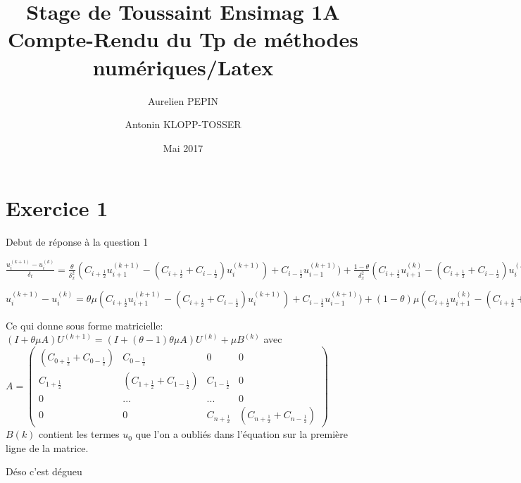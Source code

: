 \documentclass[a4paper,11pt]{article}
\title{Stage de Toussaint Ensimag 1A \\Compte-Rendu du Tp de méthodes numériques/Latex}
\author{Aurelien PEPIN \and Antonin KLOPP-TOSSER}
\date{Mai 2017}
\begin{document}
\maketitle

\section {Exercice 1}

Debut de réponse à la question 1


$\frac{u_i^{(k+1)}-u_i^{(k)}}{\delta_t} = \frac{\theta}{\delta_{x}^{2}}(C_{i+\frac{1}{2}}u_{i+1}^{(k+1)} - (C_{i+\frac{1}{2}} + C_{i-\frac{1}{2}})u_{i}^{(k+1)}) +
C_{i-\frac{1}{2}}u_{i-1}^{(k+1)}) + \frac{1 - \theta}{\delta_{x}^{2}}(C_{i+\frac{1}{2}}u_{i+1}^{(k)} - (C_{i+\frac{1}{2}} + C_{i-\frac{1}{2}})u_{i}^{(k)}) +
C_{i-\frac{1}{2}}u_{i-1}^{(k)}))$

\vspace{1cm}

$u_i^{(k+1)}-u_i^{(k)} = \theta \mu(C_{i+\frac{1}{2}}u_{i+1}^{(k+1)} - (C_{i+\frac{1}{2}} + C_{i-\frac{1}{2}})u_{i}^{(k+1)}) +
C_{i-\frac{1}{2}}u_{i-1}^{(k+1)}) + (1 - \theta)\mu (C_{i+\frac{1}{2}}u_{i+1}^{(k)} - (C_{i+\frac{1}{2}} + C_{i-\frac{1}{2}})u_{i}^{(k)}) +
C_{i-\frac{1}{2}}u_{i-1}^{(k)}))$

\vspace{1cm}
Ce qui donne sous forme matricielle:
\vspace{1cm}
$(I + \theta \mu A) U^{(k+1)} = (I + (\theta - 1) \theta \mu A)U^{(k)} + \mu B^{(k)}$
\vspace{1cm}
avec
$A = \begin{pmatrix}
(C_{0+\frac{1}{2}} + C_{0-\frac{1}{2}}) & C_{0-\frac{1}{2}} & 0 & 0 \\
C_{1+\frac{1}{2}} & (C_{1+\frac{1}{2}} + C_{1-\frac{1}{2}}) & C_{1-\frac{1}{2}} & 0 \\
0 & ... & ... & 0\\
0 & 0 & C_{n+\frac{1}{2}} & (C_{n+\frac{1}{2}} + C_{n-\frac{1}{2}})
\end{pmatrix}$
\vspace{1cm}
$B{(k)}$ contient les termes $u_{0}$ que l'on a oubliés dans l'équation sur la première ligne de la matrice.

\vspace{1cm}
Déso c'est dégueu
\end{document}
